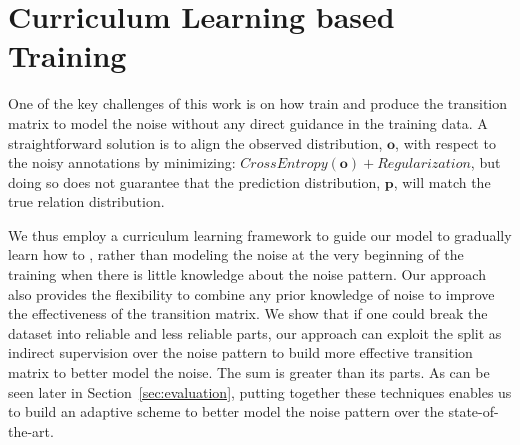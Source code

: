 \section{Curriculum Learning based Training \label{sec:training}}  

One of the key challenges of this work is  on how train and produce the transition matrix to model the noise without any direct guidance in the training data. 
A straightforward solution is to align the observed distribution, $\mathbf{o}$, with respect to the noisy annotations by minimizing:
$CrossEntropy(\mathbf{o}) + Regularization$, but doing so 
%
does not guarantee that the prediction distribution, $\mathbf{p}$, will match the true
relation distribution. 
%

%
We thus employ a curriculum
learning framework to guide our model to gradually learn how to 
,
rather than modeling the noise at the very beginning of the training when
there is little knowledge about the noise pattern.
%
%
Our approach also provides the
flexibility to combine any prior knowledge of noise to improve the
effectiveness of  the transition matrix. We show that if one could break the
dataset into reliable and less reliable parts, our approach can exploit the split
as indirect supervision over the noise pattern to build more effective
transition matrix to better model the noise. The sum is greater than its parts. 
As can be seen later in Section~\ref{sec:evaluation}, putting together these techniques
enables us to build an adaptive scheme to better model the noise pattern over the state-of-the-art. 



